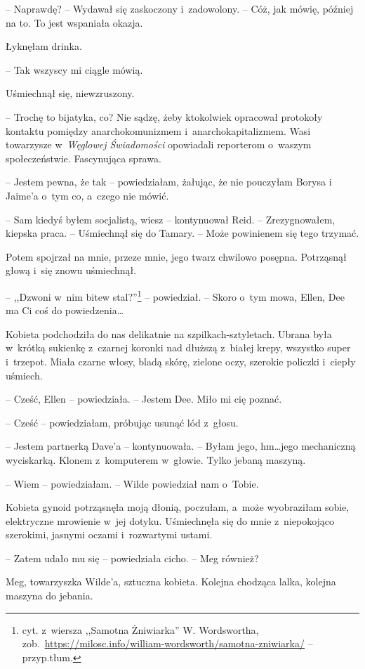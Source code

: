 \documentclass[oneside,polish,11pt,sfheadings]{mwbk}
\begin{document}
-- Naprawdę? -- Wydawał się zaskoczony i~zadowolony. -- Cóż, jak mówię,
później na to. To jest wspaniała okazja.

Łyknęłam drinka. 

-- Tak wszyscy mi ciągle mówią.

Uśmiechnął się, niewzruszony. 

-- Trochę to bijatyka, co? Nie sądzę, żeby
ktokolwiek opracował protokoły kontaktu pomiędzy anarchokomunizmem i~anarchokapitalizmem. Wasi towarzysze w~\textit{Węglowej Świadomości}
opowiadali reporterom o~waszym społeczeństwie. Fascynująca sprawa.

-- Jestem pewna, że tak -- powiedziałam, żałując, że nie pouczyłam Borysa
i Jaime'a o~tym co, a~czego nie mówić.

-- Sam kiedyś byłem socjalistą, wiesz -- kontynuował Reid. -- Zrezygnowałem, kiepska praca. -- Uśmiechnął się do Tamary. -- Może
powinienem się tego trzymać.

Potem spojrzał na mnie, przeze mnie, jego twarz chwilowo posępna.
Potrząsnął głową i~się znowu uśmiechnął.

-- ,,Dzwoni w~nim bitew stal?''\footnote{ cyt. z~wiersza ,,Samotna Żniwiarka''
W. Wordswortha, zob.~\url{https://milosc.info/william-wordsworth/samotna-zniwiarka/}
-- przyp.tłum.} -- powiedział. -- Skoro o~tym mowa, Ellen, Dee ma Ci coś
do powiedzenia\ldots 

Kobieta podchodziła do nas delikatnie na szpilkach-sztyletach.
Ubrana była w~krótką sukienkę z~czarnej koronki nad dłuższą z~białej
krepy, wszystko super i~trzepot. Miała czarne włosy, bladą skórę,
zielone oczy, szerokie policzki i~ciepły uśmiech.

-- Cześć, Ellen -- powiedziała. -- Jestem Dee. Miło mi cię poznać.

-- Cześć -- powiedziałam, próbując usunąć lód z~głosu.

-- Jestem partnerką Dave'a -- kontynuowała. -- Byłam jego, hm\ldots jego mechaniczną wyciskarką. Klonem z~komputerem w~głowie. Tylko jebaną maszyną.

-- Wiem -- powiedziałam. -- Wilde powiedział nam o~Tobie.

Kobieta gynoid potrząsnęła moją dłonią, poczułam, a~może wyobraziłam
sobie, elektryczne mrowienie w~jej dotyku. Uśmiechnęła się do mnie z~niepokojąco szerokimi, jasnymi oczami i~rozwartymi ustami.

-- Zatem udało mu się -- powiedziała cicho. -- Meg również?

Meg, towarzyszka Wilde'a, sztuczna kobieta. Kolejna chodząca lalka,
kolejna maszyna do jebania.
\end{document}
